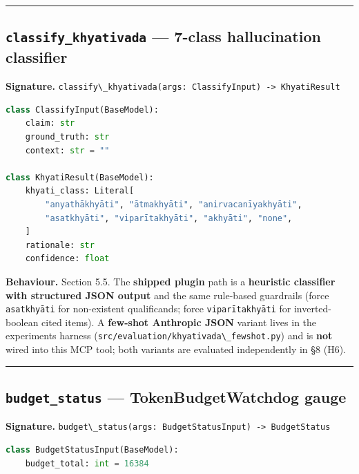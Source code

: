\begin{center}\rule{0.5\linewidth}{0.5pt}\end{center}

\subsection{\texorpdfstring{\texttt{classify\_khyativada} --- 7-class hallucination classifier}{classify\_khyativada --- 7-class hallucination classifier}}\label{classify_khyativada-7-class-hallucination-classifier}

\textbf{Signature.} \passthrough{\lstinline!classify\_khyativada(args: ClassifyInput) -> KhyatiResult!}

\begin{lstlisting}[language=Python]
class ClassifyInput(BaseModel):
    claim: str
    ground_truth: str
    context: str = ""

class KhyatiResult(BaseModel):
    khyati_class: Literal[
        "anyathākhyāti", "ātmakhyāti", "anirvacanīyakhyāti",
        "asatkhyāti", "viparītakhyāti", "akhyāti", "none",
    ]
    rationale: str
    confidence: float
\end{lstlisting}

\textbf{Behaviour.} Section 5.5. The \textbf{shipped plugin} path is a \textbf{heuristic classifier with structured JSON output} and the same rule-based guardrails (force \passthrough{\lstinline!asatkhyāti!} for non-existent qualificands; force \passthrough{\lstinline!viparītakhyāti!} for inverted-boolean cited items). A \textbf{few-shot Anthropic JSON} variant lives in the experiments harness (\passthrough{\lstinline!src/evaluation/khyativada\_fewshot.py!}) and is \textbf{not} wired into this MCP tool; both variants are evaluated independently in §8 (H6).

\begin{center}\rule{0.5\linewidth}{0.5pt}\end{center}

\subsection{\texorpdfstring{\texttt{budget\_status} --- TokenBudgetWatchdog gauge}{budget\_status --- TokenBudgetWatchdog gauge}}\label{budget_status-tokenbudgetwatchdog-gauge}

\textbf{Signature.} \passthrough{\lstinline!budget\_status(args: BudgetStatusInput) -> BudgetStatus!}

\begin{lstlisting}[language=Python]
class BudgetStatusInput(BaseModel):
    budget_total: int = 16384
\end{lstlisting}

